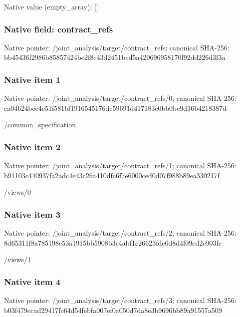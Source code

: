 \documentclass[10pt,a4paper]{article}
\begin{document}
Native value (empty\_array): []



\subsubsection{Native field: contract\_refs}


Native pointer: /joint\_analysis/target/contract\_refs; canonical SHA-256: bb45436f2986b85857424be2\allowbreak{}f8c43d2451bcd5a420696958\allowbreak{}170f92dd226d3f3a



\subsubsection{Native item 1}


Native pointer: /joint\_analysis/target/contract\_refs/0; canonical SHA-256: ca04624bce4c51f581bf1916\allowbreak{}545176dc59691d417183c0bb\allowbreak{}0be9d36b4218387d


/common\_specification


\subsubsection{Native item 2}


Native pointer: /joint\_analysis/target/contract\_refs/1; canonical SHA-256: b91103c440937fa2adc4e43c\allowbreak{}26a410dfc6f7e6000ced0d07\allowbreak{}f988b89ea330217f


/views/0


\subsubsection{Native item 3}


Native pointer: /joint\_analysis/target/contract\_refs/2; canonical SHA-256: 8d65311f8a785198e53a1915\allowbreak{}bb5908b3c4abf1e26623fde6\allowbreak{}d8d4f09ed2c903fc


/views/1


\subsubsection{Native item 4}


Native pointer: /joint\_analysis/target/contract\_refs/3; canonical SHA-256: b03f479ecad29417fe64d54f\allowbreak{}ebfa007ef0a050d7da8e3b96\allowbreak{}96bb89a91557a509
\end{document}
